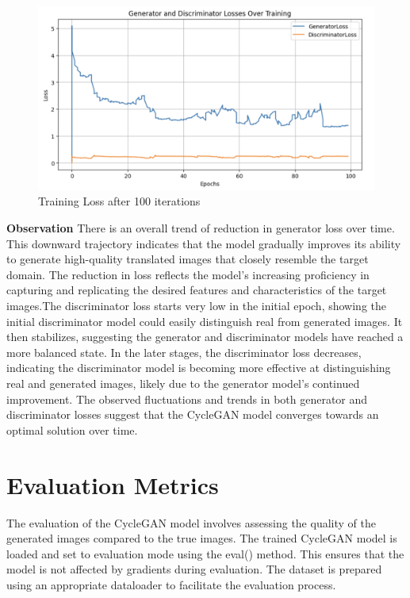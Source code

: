\documentclass[UKenglish,12pt]{master-style}
\begin{document}
\begin{figure}[htbp]
    \centering
    \includegraphics[width=1\textwidth]{Images/Training_Loss.png}
    \caption{Training Loss after 100 iterations}
    \label{fig:Training_Loss}
\end{figure}

\textbf{Observation}
There is an overall trend of reduction in generator loss over time. This downward trajectory indicates that the model gradually improves its ability to generate high-quality translated images that closely resemble the target domain. The reduction in loss reflects the model's increasing proficiency in capturing and replicating the desired features and characteristics of the target images.The discriminator loss starts very low in the initial epoch, showing the initial discriminator model could easily distinguish real from generated images. It then stabilizes, suggesting the generator and discriminator models have reached a more balanced state.
In the later stages, the discriminator loss decreases, indicating the discriminator model is becoming more effective at distinguishing real and generated images, likely due to the generator model's continued improvement. The observed fluctuations and trends in both generator and discriminator losses suggest that the CycleGAN model converges towards an optimal solution over time.
\section{Evaluation Metrics}

The evaluation of the CycleGAN model involves assessing the quality of the generated images compared to the true images. 
The trained CycleGAN model is loaded and set to evaluation mode using the eval() method. This ensures that the model is not affected by gradients during evaluation. The dataset is prepared using an appropriate dataloader to facilitate the evaluation process.
\end{document}
